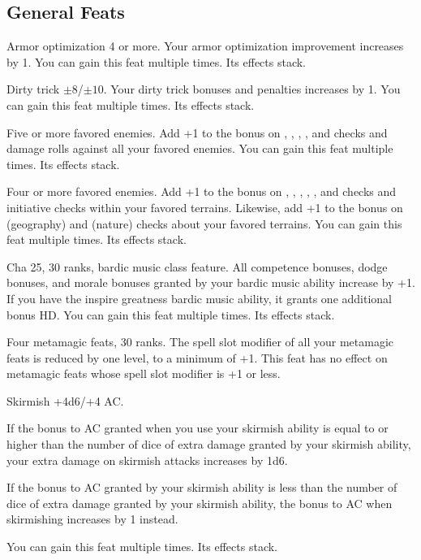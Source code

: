 \subsection{General Feats}
{}
{Armor optimization 4 or more.}
{Your armor optimization improvement increases by 1.}
{}{You can gain this feat multiple times. Its effects stack.}

{}
{Dirty trick $\pm8$/$\pm10$.}
{Your dirty trick bonuses and penalties increases by 1.}
{}{You can gain this feat multiple times. Its effects stack.}

{}
{Five or more favored enemies.}
{Add +1 to the bonus on , , , , and  checks and damage rolls against all your favored enemies.}
{}{You can gain this feat multiple times. Its effects stack.}

{}
{Four or more favored enemies.}
{Add +1 to the bonus on , , , , , and  checks and initiative checks within your favored terrains. Likewise, add +1 to the bonus on  (geography) and  (nature) checks about your favored terrains.}
{}{You can gain this feat multiple times. Its effects stack.}

{}
{Cha 25,  30 ranks, bardic music class feature.}
{All competence bonuses, dodge bonuses, and morale bonuses granted by your bardic music ability increase by +1. If you have the inspire greatness bardic music ability, it grants one additional bonus HD.}
{}{You can gain this feat multiple times. Its effects stack.}

{Four metamagic feats,  30 ranks.}
{The spell slot modifier of all your metamagic feats is reduced by one level, to a minimum of +1. This feat has no effect on metamagic feats whose spell slot modifier is +1 or less.}

{}
{Skirmish +4d6/+4 AC.}
{
If the bonus to AC granted when you use your skirmish ability is equal to or higher than the number of dice of extra damage granted by your skirmish ability, your extra damage on skirmish attacks increases by 1d6.

If the bonus to AC granted by your skirmish ability is less than the number of dice of extra damage granted by your skirmish ability, the bonus to AC when skirmishing increases by 1 instead.
}
{}{You can gain this feat multiple times. Its effects stack.}

